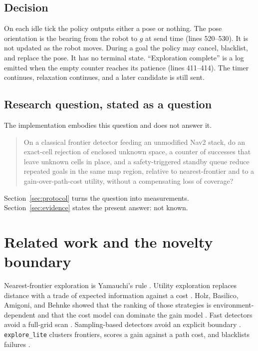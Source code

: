 \documentclass[11pt]{article}
\begin{document}
\subsection{Decision}
On each idle tick the policy outputs either a pose or nothing. The pose orientation is the bearing from the robot to $g$ at send time (lines 520--530). It is not updated as the robot moves. During a goal the policy may cancel, blacklist, and replace the pose. It has no terminal state. ``Exploration complete'' is a log emitted when the empty counter reaches its patience (lines 411--414). The timer continues, relaxation continues, and a later candidate is still sent.

\subsection{Research question, stated as a question}
The implementation embodies this question and does not answer it.

\begin{quote}
On a classical frontier detector feeding an unmodified Nav2 stack, do an exact-cell rejection of enclosed unknown space, a counter of successes that leave unknown cells in place, and a safety-triggered standby queue reduce repeated goals in the same map region, relative to nearest-frontier and to a gain-over-path-cost utility, without a compensating loss of coverage?
\end{quote}

Section~\ref{sec:protocol} turns the question into measurements. Section~\ref{sec:evidence} states the present answer: not known.

\section{Related work and the novelty boundary}
Nearest-frontier exploration is Yamauchi's rule \cite{yamauchi1997,yamauchi1998}. Utility exploration replaces distance with a trade of expected information against a cost \cite{gonzalez2002,makarenko2002,stachniss2005}. Holz, Basilico, Amigoni, and Behnke showed that the ranking of those strategies is environment-dependent and that the cost model can dominate the gain model \cite{holz2010}. Fast detectors avoid a full-grid scan \cite{keidar2014,quin2014}. Sampling-based detectors avoid an explicit boundary \cite{umari2017}. \texttt{explore\_lite} clusters frontiers, scores a gain against a path cost, and blacklists failures \cite{horner2016}.
\end{document}

